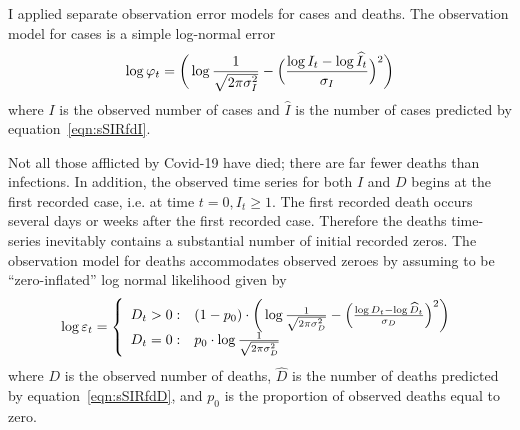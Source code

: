\documentclass[12pt,letterpaper]{article}
\begin{document}
I applied separate observation error models for cases and
deaths. The observation model for cases is a simple log-normal error
\begin{equation}
\label{eqn:logNlike}
\log\varphi_t = \bigg(\log\frac{1}{\sqrt{2\pi\sigma^2_I}} -\Bigl(\frac{\log
I_t-\log\widehat{I}_t}{\sigma_I}\Bigr)^2\bigg)\\
\end{equation}
where $I$ is the observed number of cases and $\widehat{I}$ is the
number of cases predicted by equation~\ref{eqn:sSIRfdI}.


Not all those afflicted by Covid-19 have died; there are far fewer
deaths than infections. In addition,
the observed time series for both $I$ and $D$ begins at the first recorded
case, i.e. at time $t=0, I_t \ge 1$. The first recorded death occurs
several days or weeks after the first recorded case.
Therefore the deaths time-series inevitably contains a
substantial number of initial recorded zeros. 
The observation model for deaths accommodates observed zeroes by
assuming to be ``zero-inflated'' log normal likelihood given by
\begin{equation}
\label{eqn:ZIlogNlike}
  \log \varepsilon_t = \left\{
    \begin{array}{r@{\;:\quad}l}
       D_t > 0 &
(1-p_0)\cdot\bigg(\log\frac{1}{\sqrt{2\pi\sigma^2_D}}
          -\Bigl(\frac{\log D_t-\log\widehat{D}_t}{\sigma_D}\Bigr)^2\bigg)\\
       D_t = 0 & p_0 \cdot\log \frac{1}{\sqrt{2\pi\sigma^2_D}}\\
    \end{array}
  \right.
\end{equation}
where $D$ is the observed number of deaths,
$\widehat{D}$ is the number of deaths predicted by
equation~\ref{eqn:sSIRfdD}, 
and $p_0$ is the proportion of observed deaths equal to zero.
\end{document}
